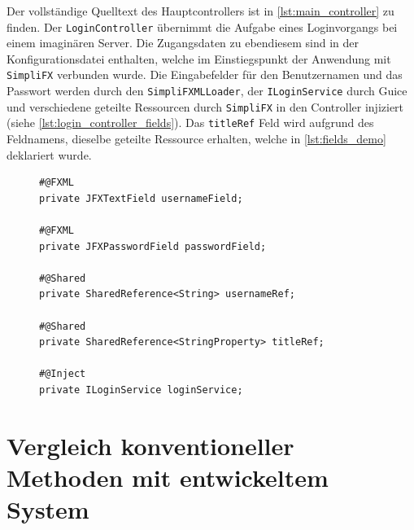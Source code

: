 \noindent Der vollständige Quelltext des Hauptcontrollers ist in \autoref{lst:main_controller} zu finden.
\noindent Der \texttt{LoginController} übernimmt die Aufgabe eines Loginvorgangs bei einem imaginären Server. Die Zugangsdaten zu ebendiesem sind in der Konfigurationsdatei enthalten, welche im Einstiegspunkt der Anwendung mit \texttt{SimpliFX} verbunden wurde. Die Eingabefelder für den Benutzernamen und das Passwort werden durch den \texttt{SimpliFXMLLoader}, der \texttt{ILoginService} durch Guice und verschiedene geteilte Ressourcen durch \texttt{SimpliFX} in den Controller injiziert (siehe \autoref{lst:login_controller_fields}). Das \texttt{titleRef} Feld wird aufgrund des Feldnamens, dieselbe geteilte Ressource erhalten, welche in \autoref{lst:fields_demo} deklariert wurde.
\begin{figure}[H]
	\begin{lstlisting}[caption=Demo -- Injizierte Felder des \texttt{LoginController}s., captionpos=b, label=lst:login_controller_fields]
#@FXML
private JFXTextField usernameField;

#@FXML
private JFXPasswordField passwordField;

#@Shared
private SharedReference<String> usernameRef;

#@Shared
private SharedReference<StringProperty> titleRef;

#@Inject
private ILoginService loginService;
	\end{lstlisting}
\end{figure}
\noindent
\section{Vergleich konventioneller Methoden mit entwickeltem System}
\label{vergleich_system_javafx}

